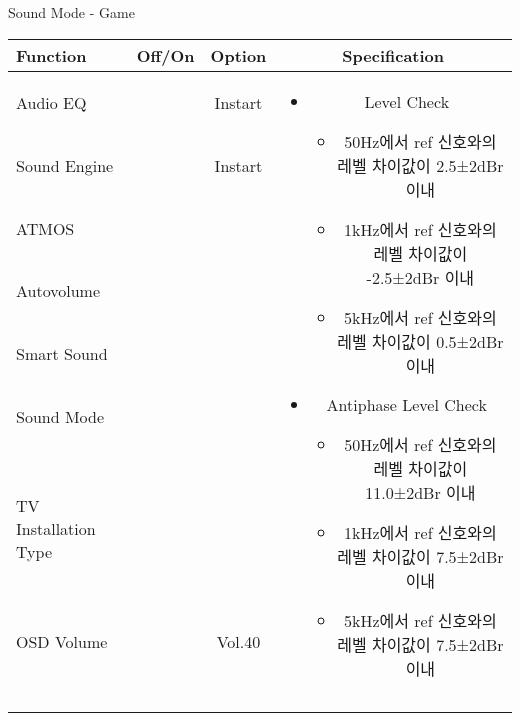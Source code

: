 \begin{frame}[t]{Sound Mode - Game}
\begin{tiny}
\begin{tabular}{@{}lccc@{}}
\toprule
Function & Off/On & Option & Specification \\
\midrule
Audio EQ & \color{black}{Off} & Instart &
\multirow{10}{60mm}{
\begin{itemize}
    \item Level Check
    \begin{itemize}
        \item 50Hz에서 ref 신호와의 레벨 차이값이 2.5±2dBr 이내
        \item 1kHz에서 ref 신호와의 레벨 차이값이 -2.5±2dBr 이내
        \item 5kHz에서 ref 신호와의 레벨 차이값이 0.5±2dBr 이내
    \end{itemize}
    \item Antiphase Level Check
    \begin{itemize}
        \item 50Hz에서 ref 신호와의 레벨 차이값이 11.0±2dBr 이내
        \item 1kHz에서 ref 신호와의 레벨 차이값이 7.5±2dBr 이내
        \item 5kHz에서 ref 신호와의 레벨 차이값이 7.5±2dBr 이내
    \end{itemize}
\end{itemize}
} \\
Sound Engine & \color{blue}{On} & Instart & \\
ATMOS & \color{black}{Off}  & & \\
Autovolume & \color{black}{Off} & & \\
Smart Sound & \color{black}{Off} & & \\
Sound Mode & \color{blue}{On} & \color{blue}{Game} & \\
TV Installation Type & \color{blue}{On} & \color{black}{Standtype1} & \\
OSD Volume & \color{blue}{On} & Vol.40 & \\
& & & \\
& & & \\
& & & \\
& & & \\
\midrule
\end{tabular}
\end{tiny}

\end{frame}
